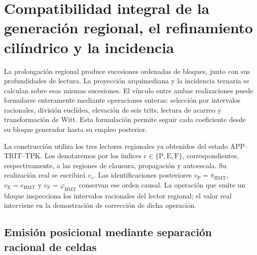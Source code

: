 
\section[Generación regional y refinamiento]{Compatibilidad integral de la generación regional, el refinamiento cilíndrico y la incidencia}
\label{act21:sec:df-lectores-cilindros}

La prolongación regional produce sucesiones ordenadas de bloques, junto con
sus profundidades de lectura. La proyección arquimediana y la incidencia
ternaria se calculan sobre esas mismas sucesiones. El vínculo entre ambas
realizaciones puede formularse enteramente mediante operaciones enteras:
selección por intervalos racionales, división euclídea, elevación de seis
trits, lectura de acarreo y transformación de Witt. Esta formulación permite
seguir cada coeficiente desde su bloque generador hasta su empleo posterior.

La construcción utiliza los tres lectores regionales ya obtenidos del estado
APP--TRIT--TPK. Los denotaremos por los índices
\(c\in\{\mathrm P,\mathrm E,\mathrm F\}\), correspondientes, respectivamente,
a las regiones de clausura, propagación y autoescala. Su realización real se
escribirá \(v_c\). Las identificaciones posteriores
\(v_{\mathrm P}=\pi_{\mathrm{HMT}}\),
\(v_{\mathrm E}=e_{\mathrm{HMT}}\) y
\(v_{\mathrm F}=\varphi_{\mathrm{HMT}}\) conservan ese orden causal.
La operación que emite un bloque inspecciona los intervalos racionales del
lector regional; el valor real interviene en la demostración de corrección
de dicha operación.

\subsection{Emisión posicional mediante separación racional de celdas}
\label{act21:subsec:df-emision-racional}


